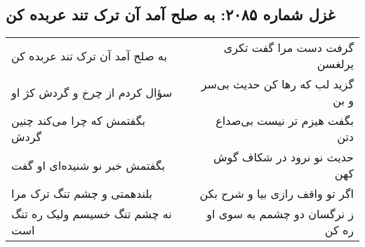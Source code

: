 \begin{center}
\section*{غزل شماره ۲۰۸۵: به صلح آمد آن ترک تند عربده کن}
\label{sec:2085}
\begin{longtable}{l p{0.5cm} r}
به صلح آمد آن ترک تند عربده کن
&&
گرفت دست مرا گفت تکری یرلغسن
\\
سؤال کردم از چرخ و گردش کژ او
&&
گزید لب که رها کن حدیث بی‌سر و بن
\\
بگفتمش که چرا می‌کند چنین گردش
&&
بگفت هیزم تر نیست بی‌صداع دتن
\\
بگفتمش خبر نو شنیده‌ای او گفت
&&
حدیث نو نرود در شکاف گوش کهن
\\
بلندهمتی و چشم تنگ ترک مرا
&&
اگر تو واقف رازی بیا و شرح بکن
\\
نه چشم تنگ خسیسم ولیک ره تنگ است
&&
ز نرگسان دو چشمم به سوی او ره کن
\\
\end{longtable}
\end{center}
